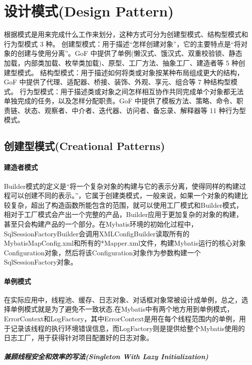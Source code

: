 \documentclass[../../../interview-questions.tex]{subfiles}
\begin{document}
\section{设计模式(Design Pattern)}

根据模式是用来完成什么工作来划分，这种方式可分为创建型模式、结构型模式和行为型模式 3 种。
创建型模式：用于描述“怎样创建对象”，它的主要特点是“将对象的创建与使用分离”。GoF 中提供了单例(懒汉式、饿汉式、双重校验锁、静态加载，内部类加载、枚举类加载)、原型、工厂方法、抽象工厂、建造者等 5 种创建型模式。
结构型模式：用于描述如何将类或对象按某种布局组成更大的结构，GoF 中提供了代理、适配器、桥接、装饰、外观、享元、组合等 7 种结构型模式。
行为型模式：用于描述类或对象之间怎样相互协作共同完成单个对象都无法单独完成的任务，以及怎样分配职责。GoF 中提供了模板方法、策略、命令、职责链、状态、观察者、中介者、迭代器、访问者、备忘录、解释器等 11 种行为型模式。


\subsection{创建型模式(Creational Patterns)}

\paragraph{建造者模式}

Builder模式的定义是“将一个复杂对象的构建与它的表示分离，使得同样的构建过程可以创建不同的表示。”，它属于创建类模式，一般来说，如果一个对象的构建比较复杂，超出了构造函数所能包含的范围，就可以使用工厂模式和Builder模式，相对于工厂模式会产出一个完整的产品，Builder应用于更加复杂的对象的构建，甚至只会构建产品的一个部分。在Mybatis环境的初始化过程中，SqlSessionFactoryBuilder会调用XMLConfigBuilder读取所有的MybatisMapConfig.xml和所有的*Mapper.xml文件，构建Mybatis运行的核心对象Configuration对象，然后将该Configuration对象作为参数构建一个SqlSessionFactory对象。

\paragraph{单例模式}

在实际应用中，线程池、缓存、日志对象、对话框对象常被设计成单例，总之，选择单例模式就是为了避免不一致状态.在Mybatis中有两个地方用到单例模式，ErrorContext和LogFactory，其中ErrorContext是用在每个线程范围内的单例，用于记录该线程的执行环境错误信息，而LogFactory则是提供给整个Mybatis使用的日志工厂，用于获得针对项目配置好的日志对象。

\subparagraph{兼顾线程安全和效率的写法(Singleton With Lazy Initialization)}
\end{document}
